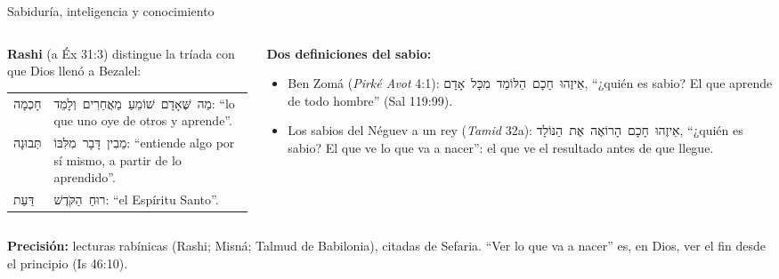 \documentclass[hyperref={bookmarks=false},aspectratio=169]{beamer}
\newcommand{\heb}[1]{\mbox{\foreignlanguage{hebrew}{#1}}}
\newcommand{\precision}[1]{{\footnotesize\color{gris}\textbf{Precisión:} #1}}
\begin{document}
\begin{frame}{Sabiduría, inteligencia y conocimiento}
\begin{columns}[t,onlytextwidth]
\begin{column}{0.50\textwidth}\small
\RaggedRight\textbf{Rashi} (a Éx 31:3) distingue la tríada con que Dios llenó a Bezalel:
\scriptsize\renewcommand{\arraystretch}{1.25}
\begin{tabular}{@{}>{\RaggedRight\arraybackslash}p{1.6cm}>{\RaggedRight\arraybackslash}p{4.2cm}@{}}
\toprule
\heb{חָכְמָה} & \heb{מַה שֶּׁאָדָם שׁוֹמֵעַ מֵאֲחֵרִים וְלָמֵד}: ``lo que uno oye de otros y aprende''. \\
\heb{תְּבוּנָה} & \heb{מֵבִין דָּבָר מִלִּבּוֹ}: ``entiende algo por sí mismo, a partir de lo aprendido''. \\
\heb{דַּעַת} & \heb{רוּחַ הַקֹּדֶשׁ}: ``el Espíritu Santo''. \\
\bottomrule
\end{tabular}
\end{column}
\begin{column}{0.48\textwidth}\small
\textbf{Dos definiciones del sabio:}
\begin{itemize}
\item Ben Zomá (\emph{Pirké Avot} 4:1): \heb{אֵיזֶהוּ חָכָם הַלּוֹמֵד מִכָּל אָדָם}, ``¿quién es sabio? El que aprende de todo hombre'' (Sal 119:99).
\item Los sabios del Néguev a un rey (\emph{Tamid} 32a): \heb{אֵיזֶהוּ חָכָם הָרוֹאֶה אֶת הַנּוֹלָד}, ``¿quién es sabio? El que ve lo que va a nacer'': el que ve el resultado antes de que llegue.
\end{itemize}
\end{column}
\end{columns}\par\smallskip
\precision{lecturas rabínicas (Rashi; Misná; Talmud de Babilonia), citadas de Sefaria. ``Ver lo que va a nacer'' es, en Dios, ver el fin desde el principio (Is 46:10).}
\end{frame}
\end{document}
